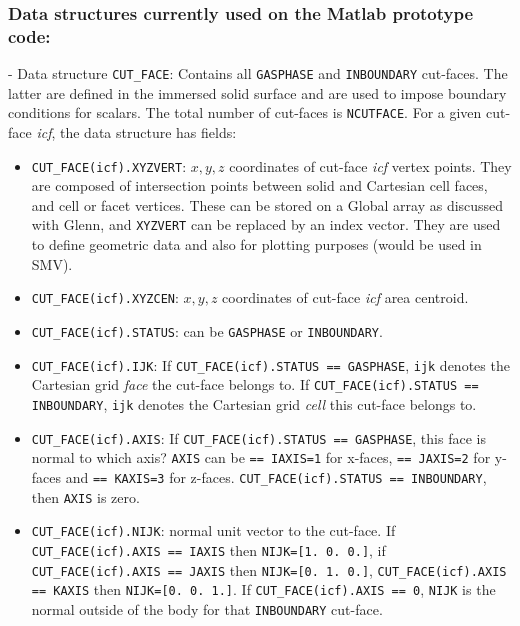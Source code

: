 \documentclass[12pt]{article}
\begin{document}
\subsubsection*{Data structures currently used on the Matlab prototype code:}

- Data structure \texttt{CUT\_FACE}: Contains all \texttt{GASPHASE} and \texttt{INBOUNDARY} cut-faces. The latter are defined in the immersed solid surface and are used to impose boundary conditions for scalars. The total number of cut-faces is \texttt{NCUTFACE}. For a given cut-face \textit{icf}, the data structure has fields:
%
\begin{itemize}

  \item  \texttt{CUT\_FACE(icf).XYZVERT}: $x,y,z$ coordinates of cut-face \textit{icf} vertex points. They are composed of intersection points between solid and Cartesian cell faces, and cell or facet vertices. These can be stored on a Global array as discussed with Glenn, and \texttt{XYZVERT} can be replaced by an index vector. They are used to define geometric data and also for plotting purposes (would be used in SMV).

  \item  \texttt{CUT\_FACE(icf).XYZCEN}: $x,y,z$ coordinates of cut-face \textit{icf} area centroid.

  \item  \texttt{CUT\_FACE(icf).STATUS}: can be \texttt{GASPHASE} or \texttt{INBOUNDARY}.

  \item  \texttt{CUT\_FACE(icf).IJK}: If \texttt{CUT\_FACE(icf).STATUS == GASPHASE}, \texttt{ijk} denotes the Cartesian grid \textit{face} the cut-face belongs to. If  \texttt{CUT\_FACE(icf).STATUS == INBOUNDARY},  \texttt{ijk} denotes the Cartesian grid \textit{cell} this cut-face belongs to.

  \item  \texttt{CUT\_FACE(icf).AXIS}: If \texttt{CUT\_FACE(icf).STATUS == GASPHASE}, this face is normal to which axis? \texttt{AXIS} can be \texttt{== IAXIS=1} for x-faces, \texttt{== JAXIS=2} for y-faces and \texttt{== KAXIS=3} for z-faces.  \texttt{CUT\_FACE(icf).STATUS == INBOUNDARY}, then  \texttt{AXIS} is zero.

  \item \texttt{CUT\_FACE(icf).NIJK}: normal unit vector to the cut-face. If \texttt{CUT\_FACE(icf).AXIS == IAXIS} then \texttt{NIJK=[1. 0. 0.]}, if
  \texttt{CUT\_FACE(icf).AXIS == JAXIS} then \texttt{NIJK=[0. 1. 0.]}, \texttt{CUT\_FACE(icf).AXIS == KAXIS} then  \texttt{NIJK=[0. 0. 1.]}. If \texttt{CUT\_FACE(icf).AXIS == 0},  \texttt{NIJK} is the normal outside of the body for that \texttt{INBOUNDARY} cut-face.


\end{itemize}
\end{document}
